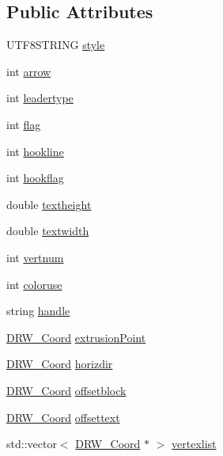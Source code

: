 \subsection*{Public Attributes}
\begin{DoxyCompactItemize}
\item 
U\-T\-F8\-S\-T\-R\-I\-N\-G \hyperlink{classDRW__Leader_a7a4e898ceae92208a03e86f7857e78e0}{style}
\item 
int \hyperlink{classDRW__Leader_a42f61a808411cf8465ec7f64c49cc4a6}{arrow}
\item 
int \hyperlink{classDRW__Leader_a4ba900b63165cb87b79612a9f9b4ff50}{leadertype}
\item 
int \hyperlink{classDRW__Leader_adcf19e8f9d127c910267e37a9d09e828}{flag}
\item 
int \hyperlink{classDRW__Leader_a80aca0277cc06cbcb4af9c6a42decf06}{hookline}
\item 
int \hyperlink{classDRW__Leader_a5d47804340900202fe3d1cd7bebbcecf}{hookflag}
\item 
double \hyperlink{classDRW__Leader_a5d4c5d32e962710240fc6ffa392c951b}{textheight}
\item 
double \hyperlink{classDRW__Leader_ab08450146f7f0658eca773a534d64be0}{textwidth}
\item 
int \hyperlink{classDRW__Leader_a8c0f8d7ebce1a2f1a4cb6d367a0c6a0d}{vertnum}
\item 
int \hyperlink{classDRW__Leader_afdff2ddfa67b8f2f46b367f52e06e027}{coloruse}
\item 
string \hyperlink{classDRW__Leader_a888e422223a71784801bc1c0d54578c1}{handle}
\item 
\hyperlink{classDRW__Coord}{D\-R\-W\-\_\-\-Coord} \hyperlink{classDRW__Leader_a9ef3ab714584747ac54612c47edd570a}{extrusion\-Point}
\item 
\hyperlink{classDRW__Coord}{D\-R\-W\-\_\-\-Coord} \hyperlink{classDRW__Leader_a31292925946b20b3c24f679c54f83523}{horizdir}
\item 
\hyperlink{classDRW__Coord}{D\-R\-W\-\_\-\-Coord} \hyperlink{classDRW__Leader_aa6a2e2b354365f405b52240c9bca3c8a}{offsetblock}
\item 
\hyperlink{classDRW__Coord}{D\-R\-W\-\_\-\-Coord} \hyperlink{classDRW__Leader_a6326c764bc74feaf7a5a3efa57325f67}{offsettext}
\item 
std\-::vector$<$ \hyperlink{classDRW__Coord}{D\-R\-W\-\_\-\-Coord} $\ast$ $>$ \hyperlink{classDRW__Leader_a7aef5bd8c0202b0c6836e15552866fcd}{vertexlist}
\end{DoxyCompactItemize}
